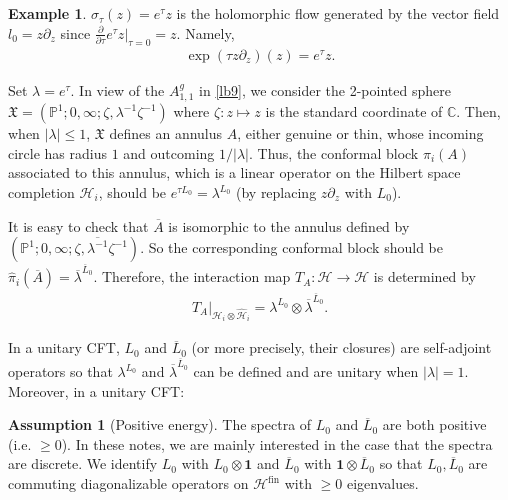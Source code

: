\documentclass[11pt,b5paper,notitlepage]{article}
\theoremstyle{definition}
\newtheorem{eg}[df]{Example}
\newtheorem{ass}[df]{Assumption}
\theoremstyle{plain}
\newcommand{\fk}{\mathfrak}
\newcommand{\mc}{\mathcal}
\newcommand{\wht}{\widehat}
\newcommand{\ovl}{\overline}
\newcommand{\id}{\mathbf{1}}
\newcommand{\Cbb}{\mathbb C}
\newcommand{\Pbb}{\mathbb P}
\newcommand{\fin}{\mathrm{fin}}
\numberwithin{equation}{section}
\begin{document}
\subsection{}\label{lb10}

\begin{eg}\label{lb14}
$\sigma_\tau(z)=e^{\tau}z$ is the holomorphic flow generated by the vector field $l_0=z\partial_z$ since $\frac\partial{\partial\tau}e^\tau z|_{\tau=0}=z$. Namely,
\begin{align*}
\exp(\tau z\partial_z)(z)=e^\tau z.	
\end{align*}
\end{eg}



Set $\lambda=e^\tau$. In view of the  $A_{1,1}^g$ in \ref{lb9}, we consider the 2-pointed sphere $\fk X=(\Pbb^1;0,\infty;\zeta,\lambda^{-1}\zeta^{-1})$ where $\zeta:z\mapsto z$ is the standard coordinate of $\Cbb$. Then, when $|\lambda|\leq 1$, $\fk X$ defines an annulus $A$, either genuine or thin, whose incoming circle has radius $1$ and outcoming $1/|\lambda|$. Thus, the conformal block $\pi_i(A)$ associated to this annulus, which is a linear operator on the Hilbert space completion $\mc H_i$, should be $e^{\tau L_0}=\lambda^{L_0}$ (by replacing $z\partial_z$ with $L_0$). 

It is easy to check that $\ovl A$ is isomorphic to the annulus defined by $(\Pbb^1;0,\infty;\zeta,\ovl{\lambda^{-1}}\zeta^{-1})$. So the corresponding conformal block should be $\wht\pi_i(\ovl A)=\ovl\lambda^{\ovl L_0}$. Therefore, the interaction map $T_A:\mc H\rightarrow\mc H$ is determined by
\begin{align}
	T_A\big|_{\mc H_i\otimes\wht{\mc H}_i}=\lambda^{L_0}\otimes\ovl\lambda^{\ovl L_0}.	\label{eq9}
\end{align}

In a unitary CFT, $L_0$ and $\ovl L_0$ (or more precisely, their closures) are self-adjoint operators so that $\lambda^{L_0}$ and $\ovl\lambda^{\ovl L_0}$ can be defined and are unitary when $|\lambda|=1$. Moreover, in a unitary CFT:
\begin{ass}[Positive energy]\label{lb18}
The spectra of $L_0$ and $\ovl L_0$ are both positive (i.e. $\geq 0$). In these notes, we are mainly interested in the case that the spectra are discrete. We identify $L_0$ with $L_0\otimes\id$ and $\ovl L_0$ with $\id\otimes\ovl L_0$ so that $L_0,\ovl L_0$ are commuting diagonalizable operators on $\mc H^\fin$ with $\geq0$ eigenvalues.
\end{ass}
\end{document}
